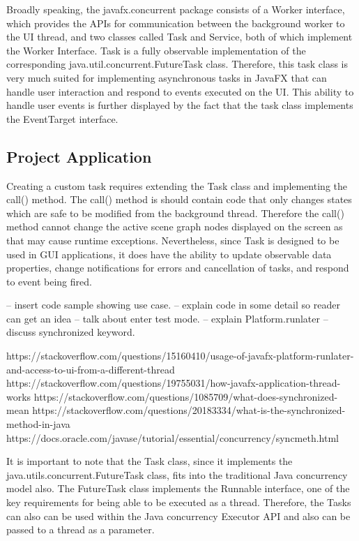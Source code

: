 Broadly speaking, the javafx.concurrent package consists of a Worker interface, which provides the APIs for communication between the background worker to the UI thread, and two classes called Task and Service, both of which implement the Worker Interface. Task is a fully observable implementation of the corresponding java.util.concurrent.FutureTask class. Therefore, this task class is very much suited for implementing asynchronous tasks in JavaFX that can handle user interaction and respond to events executed on the UI. This ability to handle user events is further displayed by the fact that the task class implements the EventTarget interface.  

\subsection{Project Application}
%
Creating a custom task requires extending the Task class and implementing the call() method. The call() method is should contain code that only changes states which are safe to be modified from the background thread. Therefore the call() method cannot change the active scene graph nodes displayed on the screen as that may cause runtime exceptions. Nevertheless, since Task is designed to be used in GUI applications, it does have the ability to update observable data properties, change notifications for errors and cancellation of tasks, and respond to event being fired.

-- insert code sample showing use case. 
-- explain code in some detail so reader can get an idea
-- talk about enter test mode. 
-- explain Platform.runlater
-- discuss synchronized keyword. 

https://stackoverflow.com/questions/15160410/usage-of-javafx-platform-runlater-and-access-to-ui-from-a-different-thread
https://stackoverflow.com/questions/19755031/how-javafx-application-thread-works
https://stackoverflow.com/questions/1085709/what-does-synchronized-mean
https://stackoverflow.com/questions/20183334/what-is-the-synchronized-method-in-java
https://docs.oracle.com/javase/tutorial/essential/concurrency/syncmeth.html



It is important to note that the Task class, since it implements the java.utils.concurrent.FutureTask class, fits into the traditional Java concurrency model also. The FutureTask class implements the Runnable interface, one of the key requirements for being able to be executed as a thread. Therefore, the Tasks can also can be used within the Java concurrency Executor API and also can be passed to a thread as a parameter.

